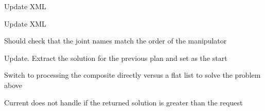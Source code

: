 \begin{DoxyRefList}
\label{todo__todo000021}%
%
Update XML  
\item[Member \mbox{\hyperlink{classtesseract__planning_1_1OMPLDefaultPlanProfile_a9ceeaf8d8a01e483992a71b15cb32df4}{tesseract\+\_\+planning\+::OMPLDefault\+Plan\+Profile\+::to\+XML}} (tinyxml2\+::\+XMLDocument \&doc) const override]\label{todo__todo000026}%
%
Update XML  
\item[Member \mbox{\hyperlink{classtesseract__planning_1_1OMPLMotionPlanner_a2640a0313b4f72a8f0dc5b63db2bc5e0}{tesseract\+\_\+planning\+::OMPLMotion\+Planner\+::create\+Sub\+Problem}} (const \mbox{\hyperlink{structtesseract__planning_1_1PlannerRequest}{Planner\+Request}} \&request, const tesseract\+\_\+common\+::\+Manipulator\+Info \&composite\+\_\+mi, const tesseract\+\_\+kinematics\+::\+Joint\+Group\+::\+Const\+Ptr \&manip, const \mbox{\hyperlink{structtesseract__planning_1_1MoveInstructionPoly}{Move\+Instruction\+Poly}} \&start\+\_\+instruction, const \mbox{\hyperlink{structtesseract__planning_1_1MoveInstructionPoly}{Move\+Instruction\+Poly}} \&end\+\_\+instruction, int n\+\_\+output\+\_\+states, int index) const]\label{todo__todo000019}%
%
Should check that the joint names match the order of the manipulator 

\label{todo__todo000020}%
%
Update. Extract the solution for the previous plan and set as the start  
\item[Member \mbox{\hyperlink{classtesseract__planning_1_1OMPLMotionPlanner_acbe96b10701a59c016d78ba4aae922eb}{tesseract\+\_\+planning\+::OMPLMotion\+Planner\+::solve}} (const \mbox{\hyperlink{structtesseract__planning_1_1PlannerRequest}{Planner\+Request}} \&request) const override]\label{todo__todo000018}%
%
Switch to processing the composite directly versus a flat list to solve the problem above ~\newline
 

\label{todo__todo000017}%
%
Current does not handle if the returned solution is greater than the request 


\end{DoxyRefList}
